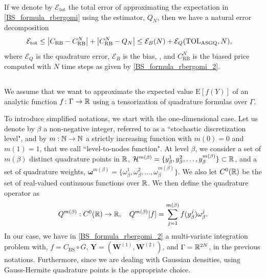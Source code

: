 If we denote by $\mathcal{E}_{\text{tot}}$ the total error of approximating the  expectation in \eqref{BS_formula_rbergomi} using the  estimator, $Q_N$, then we have a natural error decomposition
\begin{align}\label{eq:total_error}
\mathcal{E}_{\text{tot}} & \le \left\lvert C_{\text{RB}}-C_{\text{RB}}^N\right\rvert+\left\lvert C_{\text{RB}}^N-Q_{N}\right\rvert \le \mathcal{E}_B(N)+ \mathcal{E}_Q(\text{TOL}_{\text{ASGQ}},N),
\end{align}
where  $\mathcal{E}_Q$ is the quadrature error, $\mathcal{E}_B$  is the bias, , and $C_{\text{RB}}^N$ is the biased price computed with $N$ time steps as given by \eqref{BS_formula_rbergomi_2}.

\subsection{}\label{sec:Details of the MISC}

We assume that we want to approximate the expected value $\text{E}[f(Y)]$ of an analytic function $f\colon \Gamma \to \mathbb{R}$ using a tensorization of quadrature formulas over $\Gamma$.

To introduce simplified notations, we start with the one-dimensional case. Let us denote by $\beta$ a non-negative integer, referred to as a ``stochastic discretization level", and by $m: \mathbb{N} \rightarrow \mathbb{N}$  a strictly increasing function with $m(0)=0$ and $m(1)=1$, that we call  ``level-to-nodes function". At level $\beta$, we consider a set of $m(\beta)$ distinct quadrature points in $\mathbb{R}$, $\mathcal{H}^{m(\beta)}=\{y^1_\beta,y^2_\beta,\dots,y_\beta^{m(\beta)}\} \subset \mathbb{R}$, and a set of quadrature weights, $\boldsymbol{\omega}^{m(\beta)}=\{\omega^1_\beta,\omega^2_\beta,\dots,\omega_\beta^{m(\beta)}\}$. We also let $C^0(\mathbb{R})$ be the set of real-valued continuous functions over $\mathbb{R}$. We then define the quadrature operator as
\begin{equation*}
Q^{m(\beta)}:C^0(\mathbb{R}) \rightarrow \mathbb{R}, \quad Q^{m(\beta)}[f]= \sum_{j=1}^{m(\beta)} f(y^j_\beta) \omega_\beta^j.
\end{equation*}
In our case, we have in \eqref{BS_formula_rbergomi_2} a multi-variate integration problem with,  $f=C_{\text{BS}}\circ G$, $\mathbf{Y}=(\mathbf{W}^{(1)},\mathbf{W}^{(2)})$, and  $\Gamma=\mathbb{R}^{2N}$, in the previous notations. Furthermore, since we are dealing with Gaussian densities, using Gauss-Hermite quadrature points is the appropriate choice.

